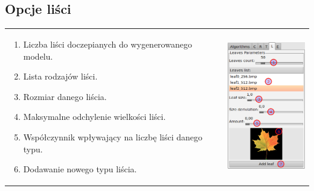 \subsection{Opcje liści}
\begin{tabular}{lr}
\parbox[c]{95mm}{
\begin{enumerate}
	\item {Liczba liści doczepianych do wygenerowanego modelu.}
	\item {Lista rodzajów liści.}
	\item {Rozmiar danego liścia.}
	\item {Maksymalne odchylenie wielkości liści.}
	\item {Współczynnik wpływający na liczbę liści danego typu.}
	\item {Dodawanie nowego typu liścia.}
\end{enumerate}
} &
\parbox[c]{35mm}{
\includegraphics[width=35mm]{images/gui/leaves_panel.png}
}\\
\end{tabular}




